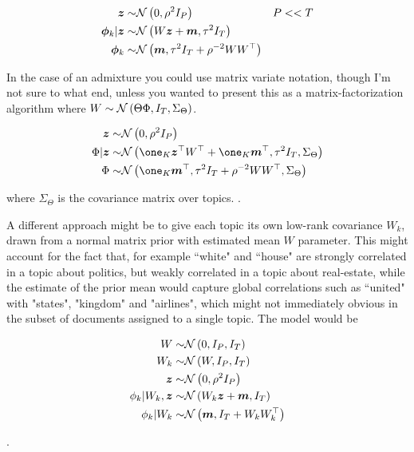 \begin{align}
\bm z \sim & \mathcal{N} \left( {0}, {\rho^2 I_P} \right) & P << T \\
\bm \phi_k | \bm z  \sim & \mathcal{N} \left( {W \bm z + \bm m}, {\tau^2 I_T} \right) \\
\bm \phi_k \sim & \mathcal{N} \left( {\bm m}, {\tau^2 I_T + \rho^{-2} W W^\top} \right)
\end{align}

In the case of an admixture you could use matrix variate notation, though I'm not sure to what end, unless you wanted to present this as a matrix-factorization algorithm where $W \sim \mathcal{N} \left(\Theta \Phi, I_T, \Sigma_\Theta\right)$.

\begin{align}
\vv{z} \sim & \nor{0}{\rho^2 I_P}  \\
\Phi | \vv{z} \sim & \mnor{\one_K \vv{z}\T W\T + \one_K\vv{m}\T}{\tau^2 I_T}{\Sigma_\Theta} \\
\Phi \sim & \mnor{\one_K\vv{m}\T}{\tau^2 I_T + \rho^{-2} W W\T}{\Sigma_\Theta} \\
\end{align}

where $\Sigma_\Theta$ is the covariance matrix over topics. . 

A different approach might be to give each topic its own low-rank covariance $W_k$, drawn from a normal matrix prior with estimated mean $W$ parameter. This might account for the fact that, for example ``white" and ``house" are strongly correlated in a topic about politics, but weakly correlated in a topic about real-estate, while the estimate of the prior mean would capture global correlations such as ``united" with "states", "kingdom" and "airlines", which might not immediately obvious in the subset of documents assigned to a single topic. The model would be

\begin{align}
W \sim & \mathcal{N} \left(0, I_P, I_T\right) \\
W_k \sim & \mathcal{N} \left(W, I_P, I_T\right) \\
\bm z \sim & \mathcal{N} \left( {0}, {\rho^2 I_P} \right)  \\
\phi_k | W_k, \bm z \sim & \mathcal{N} \left( {W_k \bm z + \bm m}, {I_T} \right) \\
\phi_k | W_k \sim & \mathcal{N} \left( {\bm m}, {I_T + W_k W_k^\top} \right)
\end{align}

. 

